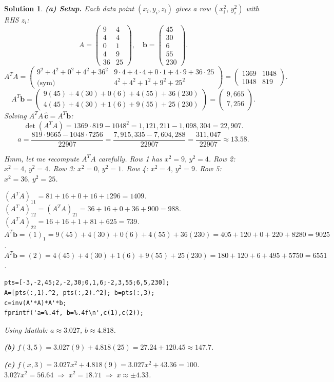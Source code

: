 \documentclass[11pt,a4paper]{article}
\theoremstyle{sol}
\newtheorem*{solution}{Solution}
\begin{document}
\begin{solution}
\textbf{(a) Setup.} Each data point $(x_i,y_i,z_i)$ gives a row $(x_i^2,\,y_i^2)$ with RHS $z_i$:
\[
A=\begin{pmatrix}9&4\\4&4\\0&1\\4&9\\36&25\end{pmatrix},\quad
\mathbf{b}=\begin{pmatrix}45\\30\\6\\55\\230\end{pmatrix}.
\]
\[
A^TA=\begin{pmatrix}9^2+4^2+0^2+4^2+36^2 & 9\cdot4+4\cdot4+0\cdot1+4\cdot9+36\cdot25\\
\text{(sym)} & 4^2+4^2+1^2+9^2+25^2\end{pmatrix}
=\begin{pmatrix}1369&1048\\1048&819\end{pmatrix}.
\]
\[
A^T\mathbf{b}=\begin{pmatrix}9(45)+4(30)+0(6)+4(55)+36(230)\\4(45)+4(30)+1(6)+9(55)+25(230)\end{pmatrix}
=\begin{pmatrix}9{,}665\\7{,}256\end{pmatrix}.
\]
Solving $A^TA\,\hat{\mathbf{c}}=A^T\mathbf{b}$:
\[
\det(A^TA)=1369\cdot819-1048^2=1{,}121{,}211-1{,}098{,}304=22{,}907.
\]
\[
a=\frac{819\cdot9665-1048\cdot7256}{22907}=\frac{7{,}915{,}335-7{,}604{,}288}{22907}=\frac{311{,}047}{22907}\approx13.58.
\]

Hmm, let me recompute $A^TA$ carefully. Row 1 has $x^2=9,\,y^2=4$. Row 2: $x^2=4,\,y^2=4$. Row 3: $x^2=0,\,y^2=1$. Row 4: $x^2=4,\,y^2=9$. Row 5: $x^2=36,\,y^2=25$.

$(A^TA)_{11}=81+16+0+16+1296=1409$. $(A^TA)_{12}=(A^TA)_{21}=36+16+0+36+900=988$.
$(A^TA)_{22}=16+16+1+81+625=739$.
$A^T\mathbf{b}=(1)_1=9(45)+4(30)+0(6)+4(55)+36(230)=405+120+0+220+8280=9025$.
$A^T\mathbf{b}=(2)=4(45)+4(30)+1(6)+9(55)+25(230)=180+120+6+495+5750=6551$.

\begin{lstlisting}
pts=[-3,-2,45;2,-2,30;0,1,6;-2,3,55;6,5,230];
A=[pts(:,1).^2, pts(:,2).^2]; b=pts(:,3);
c=inv(A'*A)*A'*b;
fprintf('a=%.4f, b=%.4f\n',c(1),c(2));
\end{lstlisting}

Using Matlab: $a\approx3.027$, $b\approx4.818$.

\textbf{(b)} $f(3,5)=3.027(9)+4.818(25)=27.24+120.45\approx\mathbf{147.7}$.

\textbf{(c)} $f(x,3)=3.027x^2+4.818(9)=3.027x^2+43.36=100$.
$3.027x^2=56.64\;\Rightarrow\; x^2=18.71\;\Rightarrow\; x\approx\pm4.33$.
\end{solution}
\end{document}
